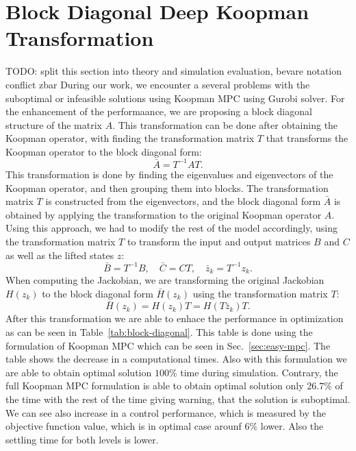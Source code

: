 \documentclass[preprint,12pt,authoryear]{elsarticle}
\newcommand{\todo}[1]{{{\color{red} TODO: #1	}} }
\begin{document}
\section{Block Diagonal Deep Koopman Transformation}
\todo{split this section into theory and simulation evaluation, bevare notation conflict zbar}
During our work, we encounter a several problems with the suboptimal or infeasible solutions using Koopman MPC using Gurobi solver. For the enhancement of the performaance, we are proposing a block diagonal structure of the matrix \(A\). This transformation can be done after obtaining the Koopman operator, with finding the transformation matrix \(T\) that transforms the Koopman operator to the block diagonal form:
\begin{equation}
  \bar{A} = T^{-1} A T.
\end{equation}
This transformation is done by finding the eigenvalues and eigenvectors of the Koopman operator, and then grouping them into blocks. The transformation matrix \(T\) is constructed from the eigenvectors, and the block diagonal form \(\bar{A}\) is obtained by applying the transformation to the original Koopman operator \(A\). Using this approach, we had to modify the rest of the model accordingly, using the transformation matrix \(T\) to transform the input and output matrices \(B\) and \(C\) as well as the lifted states \(z\):
\begin{equation}
  \bar{B} = T^{-1} B, \quad \bar{C} = C T, \quad \bar{z}_k = T^{-1} z_k.
\end{equation}
When computing the Jackobian, we are transforming the original Jackobian \(H(z_k)\) to the block diagonal form \(\bar{H}(z_k)\) using the transformation matrix \(T\):
\begin{equation}
  \bar{H}(z_k) = H(z_k) T = H(T\bar{z}_k) T.
\end{equation}
After this transformation we are able to enhace the performance in optimization as can be seen in Table~\ref{tab:block-diagonal}. This table is done using the formulation of Koopman MPC which can be seen in Sec.~\ref{sec:easy-mpc}. The table shows the decrease in a computational times. Also with this formulation we are able to obtain optimal solution \(100\%\) time during simulation. Contrary, the full Koopman MPC formulation is able to obtain optimal solution only \(26.7\%\) of the time with the rest of the time giving warning, that the solution is suboptimal. We can see also increase in a control performance, which is measured by the objective function value, which is in optimal case arounf \(6\%\) lower. Also the settling time for both levels is lower. 
\end{document}
